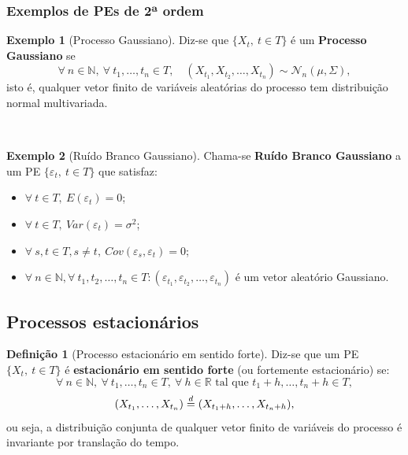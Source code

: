 \documentclass[
  11pt,
  a4paper,
]{book}
\theoremstyle{definition}
\newtheorem{definition}{Definição}[chapter]
\theoremstyle{definition}
\newtheorem{example}{Exemplo}[chapter]
\theoremstyle{definition}
\theoremstyle{definition}
\theoremstyle{remark}
\begin{document}
\subsubsection{Exemplos de PEs de 2ª ordem}\label{exemplos-de-pes-de-2uxaa-ordem}

\begin{example}[Processo Gaussiano]
Diz-se que \(\{X_t, ~t \in T\}\) é um \textbf{Processo Gaussiano} se
\[
\forall ~n \in \mathbb{N},~ \forall ~t_1, \ldots, t_n \in T, \quad (X_{t_1}, X_{t_2}, \ldots, X_{t_n}) \sim \mathcal{N}_n(\mu, \Sigma),
\]
isto é, qualquer vetor finito de variáveis aleatórias do processo tem distribuição normal multivariada.
\end{example}

\(\,\)

\begin{example}[Ruído Branco Gaussiano]

Chama-se \textbf{Ruído Branco Gaussiano} a um PE \(\{\varepsilon_t, ~t \in T\}\) que satisfaz:

\begin{itemize}
\item
  \(\forall ~t \in T, ~E(\varepsilon_t)=0\);
\item
  \(\forall ~t \in T, ~Var(\varepsilon_t)=\sigma^2\);
\item
  \(\forall ~s, t \in T, s \neq t, ~Cov(\varepsilon_s,\varepsilon_t)=0\);
\item
  \(\forall ~n \in \mathbb{N}, \forall ~t_1, t_2, \ldots, t_n \in T: (\varepsilon_{t_1}, \varepsilon_{t_2}, \ldots, \varepsilon_{t_n})\) é um vetor aleatório Gaussiano.
\end{itemize}

\end{example}

\subsection{Processos estacionários}\label{processos-estacionuxe1rios}

\begin{definition}[Processo estacionário em sentido forte]
Diz-se que um PE \(\{X_t,~ t \in T\}\) é \textbf{estacionário em sentido forte} (ou fortemente estacionário) se:
\[\forall~n \in \mathbb{N},~ \forall~t_1, \ldots, t_n \in T,~ \forall~h \in \mathbb{R} \text{ tal que } t_1 + h, \ldots, t_n + h \in T,\]
\[(X_{t_1}, \ldots, X_{t_n}) \buildrel d \over = (X_{t_1+h}, \ldots, X_{t_n+h}),\]
ou seja, a distribuição conjunta de qualquer vetor finito de variáveis do processo é invariante por translação do tempo.
\end{definition}
\end{document}
